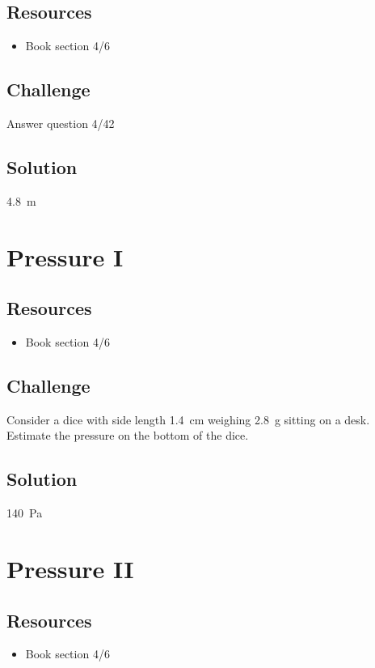 \subsection*{Resources}
\begin{itemize}
    \item Book section 4/6
\end{itemize}

\subsection*{Challenge}
Answer question 4/42

\subsection*{Solution}
\SI{4.8}{\meter}




\newpage
\section{Pressure I}

\subsection*{Resources}
\begin{itemize}
    \item Book section 4/6
\end{itemize}

\subsection*{Challenge}
Consider a dice with side length \SI{1.4}{\cm} weighing \SI{2.8}{\gram} sitting on a desk. Estimate the pressure on the bottom of the dice.

\subsection*{Solution}
\SI{140}{\pascal}




\newpage
\section{Pressure II}

\subsection*{Resources}
\begin{itemize}
    \item Book section 4/6
\end{itemize}

